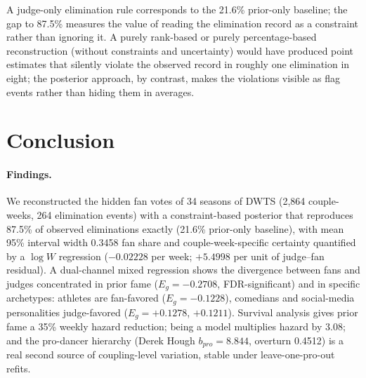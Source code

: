 A judge-only elimination rule corresponds to the 21.6\% prior-only baseline; the
gap to 87.5\% measures the value of reading the elimination record as a
constraint rather than ignoring it. A purely rank-based or purely
percentage-based reconstruction (without constraints and uncertainty) would
have produced point estimates that silently violate the observed record in
roughly one elimination in eight; the posterior approach, by contrast, makes
the violations visible as flag events rather than hiding them in averages.

\section{Conclusion}\label{sec:conclusion}

\paragraph{Findings.} We reconstructed the hidden fan votes of 34 seasons of DWTS
(2{,}864 couple-weeks, 264 elimination events) with a constraint-based posterior
that reproduces 87.5\% of observed eliminations exactly (21.6\% prior-only
baseline), with mean 95\% interval width 0.3458 fan share and couple-week-specific
certainty quantified by a $\log W$ regression ($-0.02228$ per week;
$+5.4998$ per unit of judge--fan residual). A dual-channel mixed regression
shows the divergence between fans and judges concentrated in prior fame
($E_g = -0.2708$, FDR-significant) and in specific archetypes: athletes are
fan-favored ($E_g = -0.1228$), comedians and social-media personalities
judge-favored ($E_g = +0.1278$, $+0.1211$). Survival analysis gives prior fame
a 35\% weekly hazard reduction; being a model multiplies hazard by 3.08; and the
pro-dancer hierarchy (Derek Hough $b_{pro} = 8.844$, overturn 0.4512) is a real
second source of coupling-level variation, stable under leave-one-pro-out
refits.

